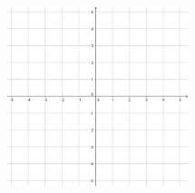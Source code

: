 \documentclass[a4paper]{oblivoir}
\begin{document}
\begin{figure}
\hspace{30pt}\includegraphics[width=0.47\textwidth]{55}
\end{figure}
\end{document}
